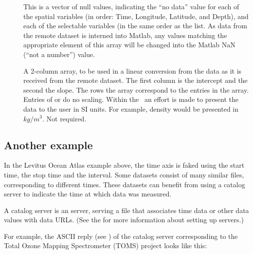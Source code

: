 \begin{description}
\item[] This is a vector of null values, indicating
  the ``no data'' value for each of the spatial variables (in order:
  Time, Longitude, Latitude, and Depth), and each of the selectable
  variables (in the same order as the  list.
  As data from the remote dataset is interned into Matlab, any values
  matching the appropriate element of this array will be changed into
  the Matlab NaN (``not a number'') value.
  
\item[] A 2-column array, to be used in a linear
  conversion from the data as it is received from the remote dataset.
  The first column is the intercept and the second the slope.  The
  rows the array correspond to the entries in the 
  array.  Entries of  or \lit{[0 1]} do no scaling.
  Within the \GUI\ an effort is made to present the data to the user
  in SI units.  For example, density would be presented in $kg/m^3$.
  Not required.
  

\end{description}
  
  

\subsection{Another example}

In the Levitus Ocean Atlas example above, the time axis is faked using
the start time, the stop time and the interval.  Some datasets consist
of many similar files, corresponding to different times.  These
datasets can benefit from using a catalog server to indicate the time
at which data was measured.

A catalog server is an \opendap server, serving a file that associates
time data or other data values with \opendap data URLs.  (See the
\OPDinstall for more information about setting up servers.)

For example, the ASCII reply (see \OPDuser) of the catalog server
corresponding to the Total Ozone Mapping Spectrometer (TOMS) project
looks like this:

